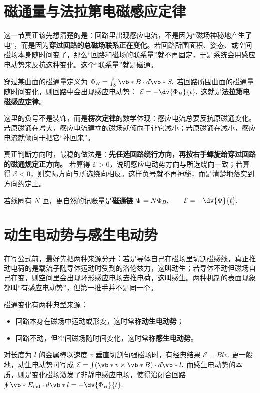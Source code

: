 \documentclass[lang=cn,11pt]{elegantbook}
\begin{document}
\section{磁通量与法拉第电磁感应定律}

这一节真正该先想清楚的是：回路里出现感应电流，不是因为“磁场神秘地产生了电”，而是因为\textbf{穿过回路的总磁场联系正在变化}。若回路所围面积、姿态、或空间磁场本身随时间变了，那么“回路和磁场的联系量”就不再固定，于是系统会用感应电动势来反抗这种变化。这个“联系量”就是磁通。

穿过某曲面的磁通量定义为
 \(\Phi_B=\int_S \vb*{B}\cdot d\vb*{S}.\) 
若回路所围曲面的磁通量随时间变化，则回路中会出现感应电动势：
 \(\mathcal{E}=-\dv{\Phi_B}{t}.\) 
这就是\textbf{法拉第电磁感应定律}。

这里的负号不是装饰，而是\textbf{楞次定律}的数学体现：感应电流总要反抗原磁通变化。若原磁通在增大，感应电流建立的磁场就倾向于让它减小；若原磁通在减小，感应电流就倾向于把它“补回来”。

\begin{remark}
真正判断方向时，最稳的做法是：\textbf{先任选回路绕行方向，再按右手螺旋给穿过回路的磁通规定正方向。} 若算得 \(\mathcal{E}>0\)，说明感应电动势方向与所选绕向一致；若算得 \(\mathcal{E}<0\)，则实际方向与所选绕向相反。这样负号就不再神秘，而是清楚地落实到方向约定上。
\end{remark}

若线圈有 \(N\) 匝，更自然的记账量是\textbf{磁通链}
 \(\Psi=N\Phi_B, \qquad \mathcal{E}=-\dv{\Psi}{t}.\) 

\section{动生电动势与感生电动势}

在写公式前，最好先把两种来源分开：若是导体自己在磁场里切割磁感线，真正推动电荷的是载流子随导体运动时受到的洛伦兹力，这叫动生；若导体不动但磁场自己在变，则空间里会出现环形感应电场去推电荷，这叫感生。两种机制的表面现象都叫“有感应电动势”，但第一推手并不是同一个。

磁通变化有两种典型来源：
\begin{itemize}
 \item 回路本身在磁场中运动或形变，这时常称\textbf{动生电动势}；
 \item 回路不动，但空间磁场随时间变化，这时常称\textbf{感生电动势}。
\end{itemize}

对长度为 \(l\) 的金属棒以速度 \(v\) 垂直切割匀强磁场时，有经典结果
 \(\mathcal{E}=Blv.\) 
更一般地，动生电动势可写成
 \(\mathcal{E}=\int (\vb*{v}\times \vb*{B})\cdot d\vb*{l}.\) 
而感生电动势的本质，则是变化磁场激发了非静电感应电场，使得沿闭合回路
 \(\oint \vb*{E}_{\mathrm{ind}}\cdot d\vb*{l}=-\dv{\Phi_B}{t}.\) 
\end{document}
